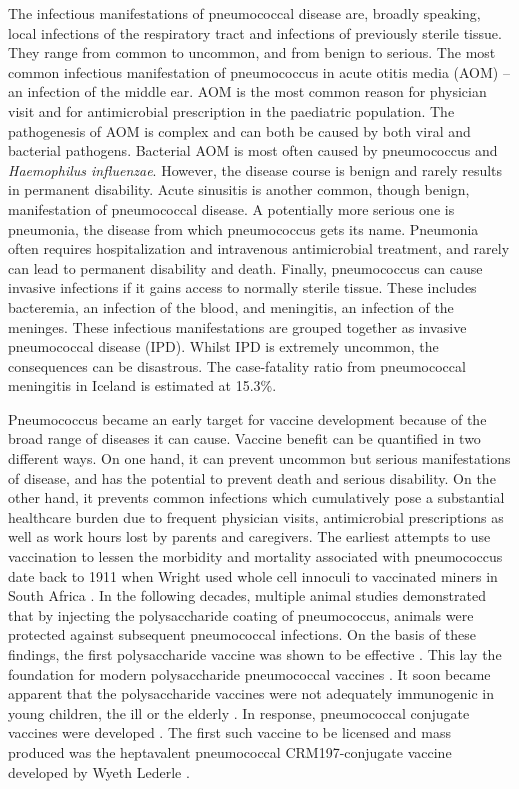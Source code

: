 \documentclass[]{book}
\theoremstyle{definition}
\theoremstyle{definition}
\theoremstyle{definition}
\theoremstyle{remark}
\begin{document}
The infectious manifestations of pneumococcal disease are, broadly
speaking, local infections of the respiratory tract and infections of
previously sterile tissue. They range from common to uncommon, and from
benign to serious. The most common infectious manifestation of
pneumococcus in acute otitis media (AOM) -- an infection of the middle
ear. AOM is the most common reason for physician visit and for
antimicrobial prescription in the paediatric population. The
pathogenesis of AOM is complex and can both be caused by both viral and
bacterial pathogens. Bacterial AOM is most often caused by pneumococcus
and \emph{Haemophilus influenzae}. However, the disease course is benign
and rarely results in permanent disability. Acute sinusitis is another
common, though benign, manifestation of pneumococcal disease. A
potentially more serious one is pneumonia, the disease from which
pneumococcus gets its name. Pneumonia often requires hospitalization and
intravenous antimicrobial treatment, and rarely can lead to permanent
disability and death. Finally, pneumococcus can cause invasive
infections if it gains access to normally sterile tissue. These includes
bacteremia, an infection of the blood, and meningitis, an infection of
the meninges. These infectious manifestations are grouped together as
invasive pneumococcal disease (IPD). Whilst IPD is extremely uncommon,
the consequences can be disastrous. The case-fatality ratio from
pneumococcal meningitis in Iceland is estimated at 15.3\%.

Pneumococcus became an early target for vaccine development because of
the broad range of diseases it can cause. Vaccine benefit can be
quantified in two different ways. On one hand, it can prevent uncommon
but serious manifestations of disease, and has the potential to prevent
death and serious disability. On the other hand, it prevents common
infections which cumulatively pose a substantial healthcare burden due
to frequent physician visits, antimicrobial prescriptions as well as
work hours lost by parents and caregivers. The earliest attempts to use
vaccination to lessen the morbidity and mortality associated with
pneumococcus date back to 1911 when Wright used whole cell innoculi to
vaccinated miners in South Africa \citep{Wright1914}. In the following
decades, multiple animal studies demonstrated that by injecting the
polysaccharide coating of pneumococcus, animals were protected against
subsequent pneumococcal infections. On the basis of these findings, the
first polysaccharide vaccine was shown to be effective
\citep{Macleod1945}. This lay the foundation for modern polysaccharide
pneumococcal vaccines \citep[\citet{Smit1977}]{Austrian1976}. It soon
became apparent that the polysaccharide vaccines were not adequately
immunogenic in young children, the ill or the elderly
\citep{Makela1981, Sloyer1981}. In response, pneumococcal conjugate
vaccines were developed \citep{Austrian1999a}. The first such vaccine to
be licensed and mass produced was the heptavalent pneumococcal
CRM197-conjugate vaccine developed by Wyeth Lederle
\citep{Austrian1999a, Black2000}.
\end{document}

